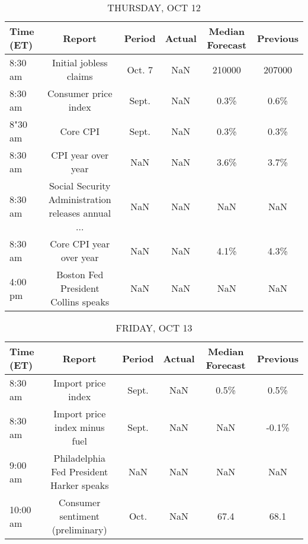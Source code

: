 \documentclass{article}%
\begin{document}
\begin{table}[htbp]%
\caption{THURSDAY, OCT 12}%
\centering%
\begin{adjustbox}{width=1\textwidth}%
\begin{tabular}{lccccc}
\toprule
Time (ET) &                                             Report & Period & Actual & Median Forecast & Previous \\
\midrule
  8:30 am &                             Initial jobless claims & Oct. 7 &    NaN &          210000 &   207000 \\
  8:30 am &                               Consumer price index &  Sept. &    NaN &            0.3\% &     0.6\% \\
  8"30 am &                                           Core CPI &  Sept. &    NaN &            0.3\% &     0.3\% \\
  8:30 am &                                 CPI year over year &    NaN &    NaN &            3.6\% &     3.7\% \\
  8:30 am & Social Security Administration releases annual ... &    NaN &    NaN &             NaN &      NaN \\
  8:30 am &                            Core CPI year over year &    NaN &    NaN &            4.1\% &     4.3\% \\
  4:00 pm &                Boston Fed President Collins speaks &    NaN &    NaN &             NaN &      NaN \\
\bottomrule
\end{tabular}
%
\end{adjustbox}%
\end{table}

%


\begin{table}[htbp]%
\caption{FRIDAY, OCT 13}%
\centering%
\begin{adjustbox}{width=1\textwidth}%
\begin{tabular}{lccccc}
\toprule
Time (ET) &                                   Report & Period & Actual & Median Forecast & Previous \\
\midrule
  8:30 am &                       Import price index &  Sept. &    NaN &            0.5\% &     0.5\% \\
  8:30 am &            Import price index minus fuel &  Sept. &    NaN &             NaN &    -0.1\% \\
  9:00 am & Philadelphia Fed President Harker speaks &    NaN &    NaN &             NaN &      NaN \\
 10:00 am &         Consumer sentiment (preliminary) &   Oct. &    NaN &            67.4 &     68.1 \\
\bottomrule
\end{tabular}
%
\end{adjustbox}%
\end{table}
\end{document}
